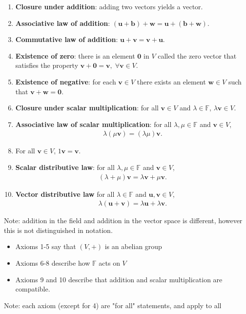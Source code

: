 \documentclass{report}
\renewcommand{\vec}{\mathbf}
\begin{document}
		\begin{enumerate}
			\item \textbf{Closure under addition}: adding two vectors yields a vector.
			\item \textbf{Associative law of addition}: $(\vec{u} + \vec{b}) + \vec{w} = \vec{u} + (\vec{b} + \vec{w})$.
			\item \textbf{Commutative law of addition}: $\vec{u} + \vec{v} = \vec{v} + \vec{u}$.
			\item \textbf{Existence of zero}: there is an element $\vec{0}$ in $V$ called the zero vector that satisfies the property $\vec{v} + \vec{0} = \vec{v},\; \forall \vec{v} \in V$.
			\item \textbf{Existence of negative}: for each $\vec{v} \in V$ there exists an element $\vec{w} \in V$ such that $\vec{v} + \vec{w} = \vec{0}$.
			\item \textbf{Closure under scalar multiplication}: for all $\vec{v} \in V$ and $\lambda \in \mathbb{F}$, $\lambda \vec{v} \in V$.
			\item \textbf{Associative law of scalar multiplication}: for all $\lambda, \mu \in \mathbb{F}$ and $\vec{v} \in V$,
				\begin{align*}
					\lambda ( \mu \vec{v} ) = ( \lambda \mu ) \vec{v}.
				\end{align*}
			\item For all $\vec{v} \in  V$, $1 \vec{v} = \vec{v}$.
			\item \textbf{Scalar distributive law}: for all $\lambda, \mu \in \mathbb{F}$ and $\vec{v} \in V$,
				\begin{align*}
					( \lambda + \mu ) \vec{v} = \lambda \vec{v} + \mu \vec{v}.
				\end{align*}
			\item \textbf{Vector distributive law} for all $\lambda \in \mathbb{F}$ and $\vec{u}, \vec{v} \in V$,
				\begin{align*}
					\lambda (\vec{u} + \vec{v}) = \lambda \vec{u} + \lambda \vec{v}.
				\end{align*}
		\end{enumerate}

		\textcolor{pastel_yellow}{Note}: addition in the field and addition in the vector space is different, however this is not distinguished in notation.
		\begin{itemize}
			\item Axioms 1-5 say that $(V, +)$ is an abelian group
			\item Axioms 6-8 describe how $\mathbb{F}$ acts on $V$
			\item Axioms 9 and 10 describe that addition and scalar multiplication are compatible.
		\end{itemize}
		\textcolor{pastel_yellow}{Note}: each axiom (except for 4) are "for all" statements, and apply to all
\end{document}
